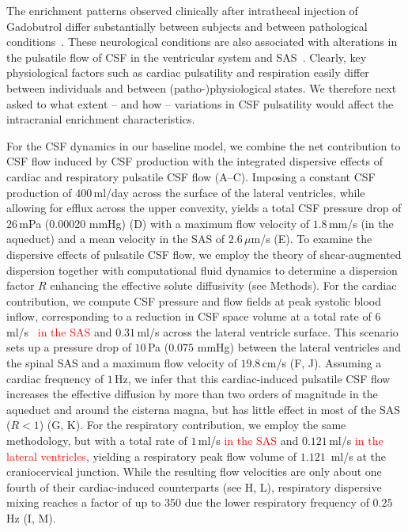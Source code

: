 \documentclass[fleqn,10pt]{wlscirep}
\newcommand{\discuss}[1]{\textcolor{red}{#1}}
\begin{document}
The enrichment patterns observed clinically after intrathecal
injection of Gadobutrol differ substantially between subjects and
between pathological conditions~\cite{ringstad2018brain,
  eide2021direction, eide2021impaired, eide2022altered}. These
neurological conditions are also associated with alterations in the
pulsatile flow of CSF in the ventricular system and
SAS~\cite{eide2021direction}. Clearly, key physiological factors such
as cardiac pulsatility and respiration easily differ between
individuals and between (patho-)physiological states. We therefore next
asked to what extent -- and how -- variations in CSF pulsatility would
affect the intracranial enrichment characteristics.

For the CSF dynamics in our baseline model, we combine the net
contribution to CSF flow induced by CSF production with the integrated
dispersive effects of cardiac and respiratory pulsatile CSF flow
(A--C). Imposing a constant CSF production of
$400\,$ml/day across the surface of the lateral ventricles, while
allowing for efflux across the upper convexity, yields a total CSF
pressure drop of $26\,$mPa (0.00020 mmHg) (D) with a
maximum flow velocity of $1.8\,$mm/s (in the aqueduct) and a mean
velocity in the SAS of $2.6\,\mu$m/s (E). To examine the
dispersive effects of pulsatile CSF flow, we employ the theory of
shear-augmented dispersion together with computational fluid dynamics
to determine a dispersion factor $R$ enhancing the effective solute
diffusivity (see Methods). For the cardiac contribution, we compute
CSF pressure and flow fields at peak systolic blood inflow,
corresponding to a reduction in CSF space volume at a total rate of
$6\,$ml/s~\cite{baledent2014imaging, causemann2022human} \discuss{in
  the SAS} and $0.31\,$ml/s across the lateral ventricle
surface\cite{vinje2019respiratory}. This scenario sets up a pressure
drop of $10\,$Pa ($0.075$ mmHg) between the lateral ventricles and the
spinal SAS and a maximum flow velocity of $19.8\,$cm/s
(F, J). Assuming a cardiac frequency of $1\,$Hz, we
infer that this cardiac-induced pulsatile CSF flow increases the
effective diffusion by more than two orders of magnitude in the
aqueduct and around the cisterna magna, but has little effect in most
of the SAS ($R < 1$) (G, K). For the respiratory
contribution, we employ the same methodology, but with a total rate of
$1\,$ml/s \cite{gutierrez2022effect} \discuss{in the SAS} and
$0.121\,$ml/s \cite{liu2024using} \discuss{in the lateral
  ventricles}, yielding a respiratory peak flow volume of $1.121\,$
ml/s at the craniocervical junction. While
the resulting flow velocities are only about one fourth of their
cardiac-induced counterparts (see H, L), respiratory
dispersive mixing reaches a factor of up to 350 due the lower
respiratory frequency of $0.25\,$Hz (I, M).
\end{document}
